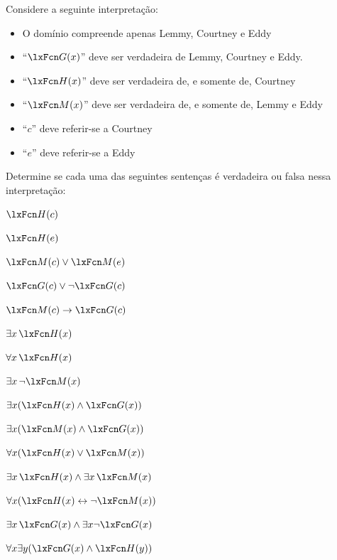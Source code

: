 \problempart
\label{pr.TorF2}
Considere a seguinte interpretação:
	\begin{itemize}
\item O domínio compreende apenas Lemmy, Courtney e Eddy
\item \textquotedblleft $\atom{G}{x}$\textquotedblright{} deve ser verdadeira de Lemmy, Courtney e Eddy.
\item \textquotedblleft $\atom{H}{x}$\textquotedblright{} deve ser verdadeira de, e somente de, Courtney
\item \textquotedblleft $\atom{M}{x}$\textquotedblright{} deve ser verdadeira de, e somente de, Lemmy e Eddy
\item \textquotedblleft $c$\textquotedblright{} deve referir-se a Courtney
\item \textquotedblleft $e$\textquotedblright{} deve referir-se a Eddy
	\end{itemize}
Determine se cada uma das seguintes sentenças é verdadeira ou falsa nessa interpretação:
\begin{compactlist}
\item $\atom{H}{c} $
\item $\atom{H}{e} $
\item $\atom{M}{c}  \eor \atom{M}{e}$
\item $\atom{G}{c}  \eor \enot \atom{G}{c}$
\item $\atom{M}{c}  \eif \atom{G}{c}$
\item $\exists x\, \atom{H}{x}$
\item $\forall x\, \atom{H}{x}$
\item $\exists x\, \enot \atom{M}{x}$
\item $\exists x(\atom{H}{x} \eand \atom{G}{x})$
\item $\exists x(\atom{M}{x} \eand \atom{G}{x})$
\item $\forall x(\atom{H}{x} \eor \atom{M}{x})$
\item $\exists x\, \atom{H}{x} \eand \exists x\, \atom{M}{x}$
\item $\forall x(\atom{H}{x} \eiff \enot \atom{M}{x})$
\item $\exists x\, \atom{G}{x} \eand \exists x \enot \atom{G}{x}$
\item $\forall x\exists y(\atom{G}{x} \eand \atom{H}{y})$
\end{compactlist}

